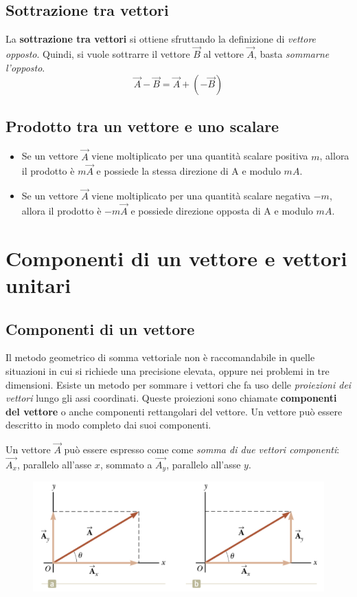 \documentclass[a4paper,11pt,oneside]{book}
\begin{document}
\subsection{Sottrazione tra vettori}
La \textbf{sottrazione tra vettori} si ottiene sfruttando la definizione di \emph{vettore opposto}.
Quindi, si vuole sottrarre il vettore $\vec{B}$ al vettore $\vec{A}$, basta \emph{sommarne l'opposto}.
\begin{equation*}
    \vec{A} - \vec{B} = \vec{A} + (- \vec{B})
\end{equation*}

\subsection{Prodotto tra un vettore e uno scalare}
\begin{itemize}
    \item Se un vettore $\vec{A}$ viene moltiplicato per una quantità scalare positiva $m$,
          allora il prodotto è $m\vec{A}$ e possiede la stessa direzione di A e modulo $mA$.
    \item Se un vettore $\vec{A}$ viene moltiplicato per una quantità scalare negativa $-m$,
          allora il prodotto è $-m\vec{A}$ e possiede direzione opposta di A e modulo $mA$.
\end{itemize}

\newpage
\section{Componenti di un vettore e vettori unitari}
\subsection{Componenti di un vettore}
Il metodo geometrico di somma vettoriale non è raccomandabile in quelle situazioni in cui si richiede una precisione elevata, oppure nei problemi in tre dimensioni.
Esiste un metodo per sommare i vettori che fa uso delle \emph{proiezioni dei vettori} lungo gli assi coordinati.
Queste proiezioni sono chiamate \textbf{componenti del vettore} o anche componenti rettangolari del vettore. Un vettore può essere descritto in modo completo dai suoi componenti.

Un vettore $\vec{A}$ può essere espresso come come \emph{somma di due vettori componenti}: $\vec{A_x}$, parallelo all'asse $x$, sommato a $\vec{A_y}$,
parallelo all'asse $y$.
\begin{figure}[h]
    \includegraphics[scale=0.5]{vettori_componenti}
    \centering
\end{figure}
\end{document}

